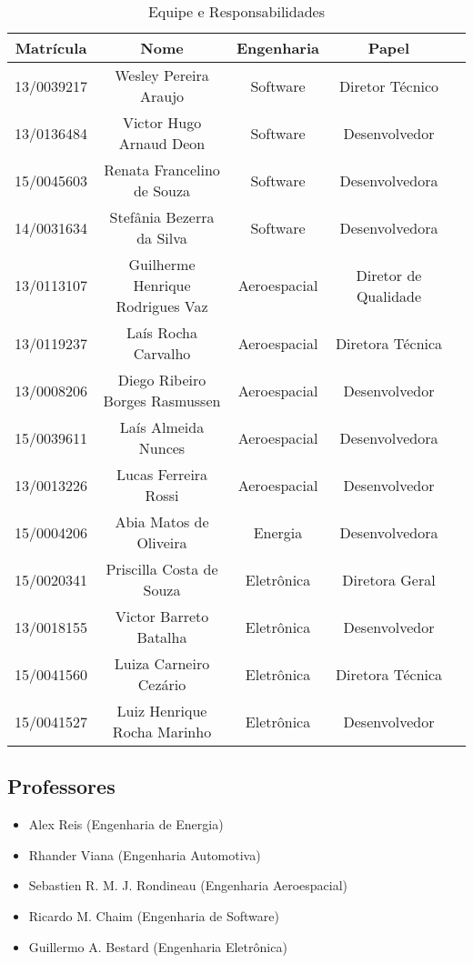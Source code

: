 \begin{table}[ht]
    \centering
	\label{equipe}
    \caption{Equipe e Responsabilidades}
    \begin{tabular}{ |c|c|c|c|c } 
        \hline
        Matrícula & Nome & Engenharia & Papel \\
        \hline
        13/0039217 & Wesley Pereira Araujo & Software & Diretor Técnico \\
        13/0136484 & Victor Hugo Arnaud Deon & Software & Desenvolvedor \\
        15/0045603 & Renata Francelino de Souza & Software & Desenvolvedora \\
        14/0031634 & Stefânia Bezerra da Silva & Software & Desenvolvedora \\
        13/0113107 & Guilherme Henrique Rodrigues Vaz & Aeroespacial & Diretor de Qualidade\\
        13/0119237 & Laís Rocha Carvalho & Aeroespacial & Diretora Técnica \\
        13/0008206 & Diego Ribeiro Borges Rasmussen & Aeroespacial & Desenvolvedor \\
        15/0039611 & Laís Almeida Nunces & Aeroespacial & Desenvolvedora \\
        13/0013226 & Lucas Ferreira Rossi & Aeroespacial & Desenvolvedor \\
        15/0004206 & Abia Matos de Oliveira & Energia & Desenvolvedora \\
        15/0020341 & Priscilla Costa de Souza & Eletrônica & Diretora Geral\\
        13/0018155 & Victor Barreto Batalha & Eletrônica & Desenvolvedor\\
        15/0041560 & Luiza Carneiro Cezário & Eletrônica & Diretora Técnica \\
        15/0041527 & Luiz Henrique Rocha Marinho & Eletrônica & Desenvolvedor \\
        \hline
    \end{tabular}
\end{table}

\subsection{Professores}

\begin{itemize}
    \item Alex Reis (Engenharia de Energia)
    \item Rhander Viana (Engenharia Automotiva)
    \item Sebastien R. M. J. Rondineau (Engenharia Aeroespacial)
    \item Ricardo M. Chaim (Engenharia de Software)
    \item Guillermo A. Bestard (Engenharia Eletrônica)
\end{itemize}

